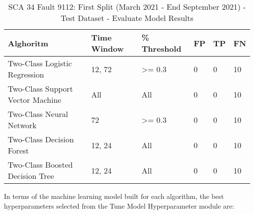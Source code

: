 \begin{table}[!ht]
    \centering
    \begin{tabular}{|l|l|l|l|l|l|}
    \hline
        Alghoritm & Time Window & \% Threshold & FP & TP & FN \\ \hline
        Two-Class Logistic Regression & 12, 72 & >= 0.3 & 0 & 0 & 10 \\ \hline
        Two-Class Support Vector Machine & All & All & 0 & 0 & 10 \\ \hline
        Two-Class Neural Network & 72 & >= 0.3 & 0 & 0 & 10 \\ \hline
        Two-Class Decision Forest & 12, 24 & All & 0 & 0 & 10 \\ \hline
        Two-Class Boosted Decision Tree & 12, 24 & All & 0 & 0 & 10 \\ \hline
    \end{tabular}
    \caption{SCA 34 Fault 9112: First Split (March 2021 - End September 2021) - Test Dataset - Evaluate Model Results}
    \label{9112_SCA34_1st}
\end{table}

In terms of the machine learning model built for each algorithm, the best hyperparameters selected from the Tune Model Hyperparameter module are:

